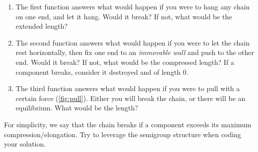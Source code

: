 \begin{gradedexercise}
\begin{enumerate}
              \begin{enumerate}
                  \item The first function answers what would happen if you were to hang any chain on one end, and let it hang.
                        Would it break?
                        If not, what would be the extended length?
                  \item The second function answers what would happen if you were to let the chain rest horizontally, then fix one end to an \emph{immovable wall} and push to the other end.
                        Would it break?
                        If not, what would be the compressed length?
                        If a component breaks, consider it destroyed and of length 0.
                  \item The third function answers what would happen if you were to pull with a certain force (\cref{fig:pull}).
                        Either you will break the chain, or there will be an equilibrium.
                        What would be the length?
              \end{enumerate}

              \begin{hint}
                  For simplicity, we say that the chain breaks if a component exceeds its maximum compression/elongation.
                  Try to leverage the semigroup structure when coding your solution.
              \end{hint}
    \end{enumerate}
\end{gradedexercise}



